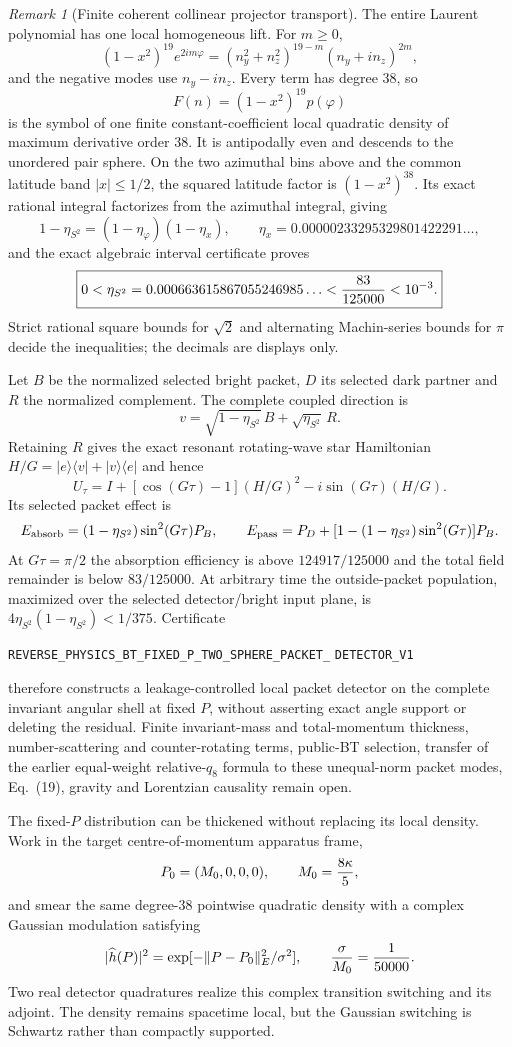 \documentclass[11pt]{article}
\theoremstyle{definition}
\theoremstyle{remark}
\newtheorem{remark}[theorem]{Remark}
\begin{document}
\begin{remark}[Finite coherent collinear projector transport]
The entire Laurent polynomial has one local homogeneous lift.  For $m\geq0$,
\[
 (1-x^2)^{19}e^{2im\varphi}
 =(n_y^2+n_z^2)^{19-m}(n_y+in_z)^{2m},
\]
and the negative modes use $n_y-in_z$.  Every term has degree $38$, so
\[
 \boxed{F(n)=(1-x^2)^{19}p(\varphi)}
\]
is the symbol of one finite constant-coefficient local quadratic density of
maximum derivative order $38$.  It is antipodally even and descends to the
unordered pair sphere.  On the two azimuthal bins above and the common
latitude band $|x|\leq1/2$, the squared latitude factor is
$(1-x^2)^{38}$.  Its exact rational integral factorizes from the azimuthal
integral, giving
\[
 1-\eta_{S^2}=(1-\eta_\varphi)(1-\eta_x),\qquad
 \eta_x=0.00000233295329801422291\ldots,
\]
and the exact algebraic interval certificate proves
\[
 \boxed{0<\eta_{S^2}
 =0.000663615867055246985\ldots
 <{83\over125000}<10^{-3}.}
\]
Strict rational square bounds for $\sqrt2$ and alternating Machin-series
bounds for $\pi$ decide the inequalities; the decimals are displays only.

Let $B$ be the normalized selected bright packet, $D$ its selected dark
partner and $R$ the normalized complement.  The complete coupled direction is
\[
 v=\sqrt{1-\eta_{S^2}}\,B+\sqrt{\eta_{S^2}}\,R.
\]
Retaining $R$ gives the exact resonant rotating-wave star Hamiltonian
$H/G=|e\rangle\langle v|+|v\rangle\langle e|$ and hence
\[
 U_\tau=I+[\cos(G\tau)-1](H/G)^2-i\sin(G\tau)(H/G).
\]
Its selected packet effect is
\[
 E_{\rm absorb}=(1-\eta_{S^2})\sin^2(G\tau)P_B,
 \qquad E_{\rm pass}=P_D+
 [1-(1-\eta_{S^2})\sin^2(G\tau)]P_B.
\]
At $G\tau=\pi/2$ the absorption efficiency is above $124917/125000$ and the
total field remainder is below $83/125000$.  At arbitrary time the outside-packet
population, maximized over the selected detector/bright input plane, is
$4\eta_{S^2}(1-\eta_{S^2})<1/375$.  Certificate
\par\noindent
\texttt{REVERSE\_PHYSICS\_BT\_FIXED\_P\_TWO\_SPHERE\_PACKET\_}
\allowbreak\texttt{DETECTOR\_V1}
\par\noindent
therefore constructs a leakage-controlled local packet detector on the
complete invariant angular shell at fixed $P$, without asserting exact angle
support or deleting the residual.  Finite invariant-mass and total-momentum
thickness, number-scattering and counter-rotating terms, public-BT selection,
transfer of the earlier equal-weight relative-$q_8$ formula to these
unequal-norm packet modes, Eq.~(19), gravity and Lorentzian causality remain
open.

The fixed-$P$ distribution can be thickened without replacing its local
density.  Work in the target centre-of-momentum apparatus frame,
\[
 P_0=(M_0,0,0,0),\qquad M_0={8\kappa\over5},
\]
and smear the same degree-38 pointwise quadratic density with a complex
Gaussian modulation satisfying
\[
 |\widehat h(P)|^2
 =\exp[-\|P-P_0\|_E^2/\sigma^2],\qquad
 {\sigma\over M_0}={1\over50000}.
\]
Two real detector quadratures realize this complex transition switching and
its adjoint.  The density remains spacetime local, but the Gaussian switching
is Schwartz rather than compactly supported.


\end{remark}
\end{document}
